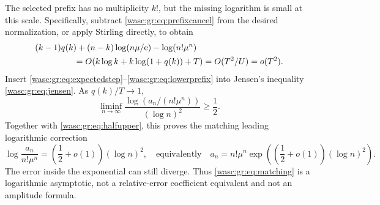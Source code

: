 \documentclass[11pt,a4paper]{article}
\theoremstyle{remark}\newtheorem{remark}[theorem]{Remark}
\numberwithin{equation}{section}
\begin{document}
The selected prefix has no multiplicity $k!$, but the missing logarithm is small at this scale. Specifically, subtract \eqref{wasc:gr:eq:prefixcancel} from the desired normalization, or apply Stirling directly, to obtain
\begin{align}\label{wasc:gr:eq:lowerprefix}
&(k-1)q(k)+(n-k)\log(n\mu/\ee)-\log(n!\mu^n)\notag\\
&\hspace{16mm}=O(k\log k+k\log(1+q(k))+T)
=O(T^2/U)=o(T^2).
\end{align}
Insert \eqref{wasc:gr:eq:expectedstep}--\eqref{wasc:gr:eq:lowerprefix} into Jensen's inequality \eqref{wasc:gr:eq:jensen}. As $q(k)/T\to1$,
\begin{equation}\label{wasc:gr:eq:halflower}
\liminf_{n\to\infty}\frac{\log(a_n/(n!\mu^n))}{(\log n)^2}\ge\frac12.
\end{equation}
Together with \eqref{wasc:gr:eq:halfupper}, this proves the matching leading logarithmic correction
\begin{equation}\label{wasc:gr:eq:matching}
\log\frac{a_n}{n!\mu^n}=\left(\frac12+o(1)\right)(\log n)^2,
\quad\text{equivalently}\quad
a_n=n!\mu^n\exp\!\left(\left(\frac12+o(1)\right)(\log n)^2\right).
\end{equation}
The error inside the exponential can still diverge. Thus \eqref{wasc:gr:eq:matching} is a logarithmic asymptotic, not a relative-error coefficient equivalent and not an amplitude formula.
\end{document}
